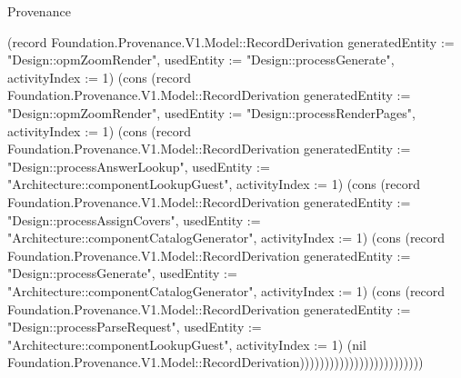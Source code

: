 \begin{lexlean}{Provenance}
\begin{semanticmodule}
{(record Foundation.Provenance.V1.Model::RecordDerivation {generatedEntity := "Design::opmZoomRender", usedEntity := "Design::processGenerate", activityIndex := 1}) (cons (record Foundation.Provenance.V1.Model::RecordDerivation {generatedEntity := "Design::opmZoomRender", usedEntity := "Design::processRenderPages", activityIndex := 1}) (cons (record Foundation.Provenance.V1.Model::RecordDerivation {generatedEntity := "Design::processAnswerLookup", usedEntity := "Architecture::componentLookupGuest", activityIndex := 1}) (cons (record Foundation.Provenance.V1.Model::RecordDerivation {generatedEntity := "Design::processAssignCovers", usedEntity := "Architecture::componentCatalogGenerator", activityIndex := 1}) (cons (record Foundation.Provenance.V1.Model::RecordDerivation {generatedEntity := "Design::processGenerate", usedEntity := "Architecture::componentCatalogGenerator", activityIndex := 1}) (cons (record Foundation.Provenance.V1.Model::RecordDerivation {generatedEntity := "Design::processParseRequest", usedEntity := "Architecture::componentLookupGuest", activityIndex := 1}) (nil Foundation.Provenance.V1.Model::RecordDerivation)))))))))))))))))))))))))
}


\end{semanticmodule}
\end{lexlean}
